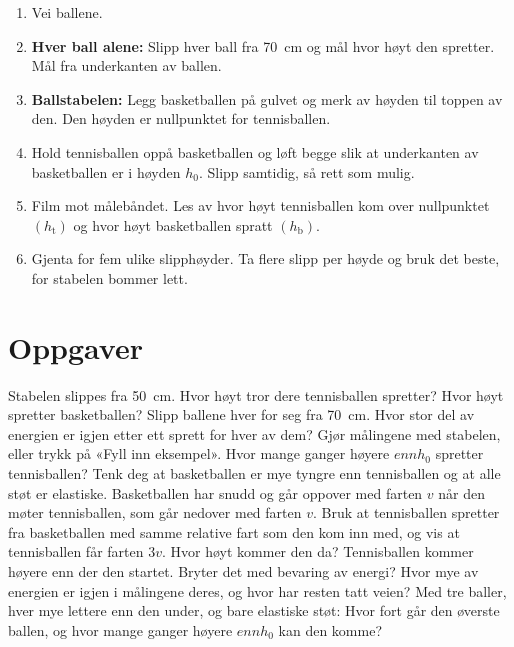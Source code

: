 \documentclass[11pt]{article}
\begin{document}
\begin{enumerate}
\item Vei ballene.
\item \textbf{Hver ball alene:} Slipp hver ball fra 70~cm og mål hvor høyt den spretter. Mål fra underkanten av ballen.
\item \textbf{Ballstabelen:} Legg basketballen på gulvet og merk av høyden til toppen av den. Den høyden er nullpunktet for tennisballen.
\item Hold tennisballen oppå basketballen og løft begge slik at underkanten av basketballen er i høyden $h_{0}$. Slipp samtidig, så rett som mulig.
\item Film mot målebåndet. Les av hvor høyt tennisballen kom over nullpunktet $(h_{\mathrm{t}})$ og hvor høyt basketballen spratt $(h_{\mathrm{b}})$.
\item Gjenta for fem ulike slipphøyder. Ta flere slipp per høyde og bruk det beste, for stabelen bommer lett.
\end{enumerate}

\section*{Oppgaver}

\begin{oppgaveliste}
\oppgave {}Stabelen slippes fra 50~cm. Hvor høyt tror dere tennisballen spretter? Hvor høyt spretter basketballen?
\svar
\oppgave {}Slipp ballene hver for seg fra 70~cm. Hvor stor del av energien er igjen etter ett sprett for hver av dem?
\svar
\oppgave {}Gjør målingene med stabelen, eller trykk på «Fyll inn eksempel». Hvor mange ganger høyere $enn h_{0}$ spretter tennisballen?
\svar
\oppgave {}Tenk deg at basketballen er mye tyngre enn tennisballen og at alle støt er elastiske. Basketballen har snudd og går oppover med farten $v$ når den møter tennisballen, som går nedover med farten $v$. Bruk at tennisballen spretter fra basketballen med samme relative fart som den kom inn med, og vis at tennisballen får farten $3v$. Hvor høyt kommer den da?
\svar
\oppgave {}Tennisballen kommer høyere enn der den startet. Bryter det med bevaring av energi? Hvor mye av energien er igjen i målingene deres, og hvor har resten tatt veien?
\svar
\oppgave {}Med tre baller, hver mye lettere enn den under, og bare elastiske støt: Hvor fort går den øverste ballen, og hvor mange ganger høyere $enn h_{0}$ kan den komme?
\svar
\end{oppgaveliste}
\end{document}
